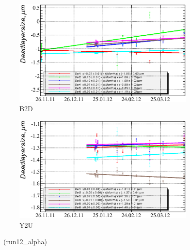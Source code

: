 \documentclass[a4paper,12pt]{article}
\begin{document}
\begin{figure}[h]
\begin{subfigure}[b]{0.5\textwidth}
\includegraphics[width=\textwidth]{gfx/run12_alpha/B2D/c_chDeadLayerSize_by_day_B2D.eps}
\caption{B2D}
\end{subfigure}
\begin{subfigure}[b]{0.5\textwidth}
\includegraphics[width=\textwidth]{gfx/run12_alpha/Y2U/c_chDeadLayerSize_by_day_Y2U.eps}
\caption{Y2U}
\end{subfigure}
\caption{\xdllabel\ (run12\_alpha)}
\end{figure}
\end{document}
